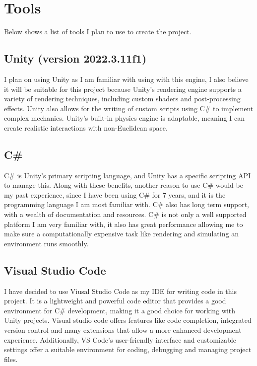 \documentclass[]{article}
\begin{document}
    \newpage
    \section{Tools}
        Below shows a list of tools I plan to use to create the project.
            \subsection{Unity (version 2022.3.11f1)} 
                I plan on using Unity as I am familiar with using with this engine, I also believe it will 
                be suitable for this project because Unity's rendering engine supports a variety of rendering techniques, 
                including custom shaders and post-processing effects. Unity also allows for the writing of custom scripts 
                using C\# to implement complex mechanics. Unity's built-in physics engine is adaptable, meaning I can create 
                realistic interactions with non-Euclidean space.
            \subsection{C\#}
                C\# is Unity's primary scripting language, and Unity has a specific scripting API to manage this. Along with these benefits,
                another reason to use C\# would be my past experience, since I have been using C\#
                for 7 years, and it is the programming language I am most familiar with. C\# also has long term support, with a wealth of 
                documentation and resources. C\# is not only a well supported platform I am very familiar with, it also has great performance 
                allowing me to make sure a computationally expensive task like rendering and simulating an environment runs smoothly.
            \subsection{Visual Studio Code}
                I have decided to use Viusal Studio Code as my IDE for writing code in this project. It is a lightweight and powerful code 
                editor that provides a good environment for C\# development, making it a good choice for working with Unity projects. Visual 
                studio code offers features like code completion, integrated version control and many extensions that allow a more enhanced 
                development experience. Additionally, VS Code's user-friendly interface and customizable settings offer a suitable environment 
                for coding, debugging and managing project files.
\end{document}
